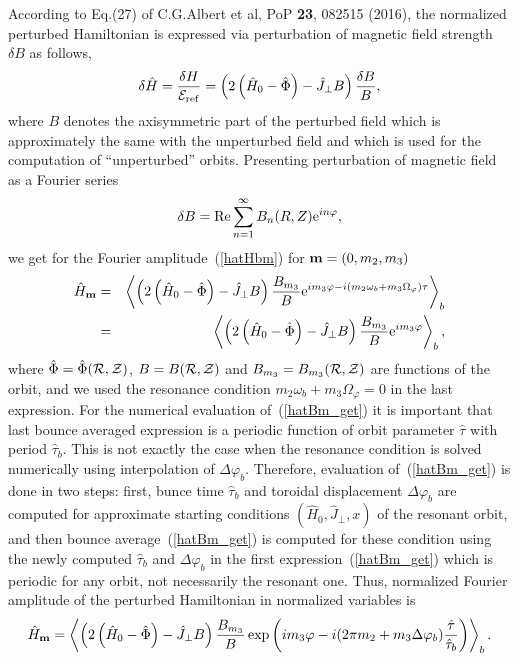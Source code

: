 \documentclass[preprint,prb,aps]{revtex4-1}
\newcommand{\be}[1]{\begin{equation} \label{#1}}
\newcommand{\ee}{\end{equation}}
\newcommand{\bea}[1]{\begin{eqnarray} \label{#1}}
\newcommand{\eea}{\end{eqnarray}}
\newcommand{\eq}[1]{(\ref{#1})}
\renewcommand{\bm}{{\bf m}}
\newcommand{\cR}{{\cal R}}
\newcommand{\cZ}{{\cal Z}}
\newcommand{\cE}{{\cal E}}
\begin{document}
According to Eq.(27) of C.G.Albert et al, PoP {\bf 23}, 082515 (2016),
the normalized perturbed Hamiltonian is expressed via perturbation
of magnetic field strength $\delta B$ as follows,
\be{normperham}
\delta\hat H = \frac{\delta H}{\cE_{\rm ref}}
=\left(2\left(\hat H_0-\hat\Phi\right)-\hat J_\perp B
\right)\frac{\delta B}{B},
\ee
where $B$ denotes the axisymmetric part of the perturbed field which is
approximately the same with the unperturbed field and which is used for the
computation of ``unperturbed'' orbits.
Presenting perturbation of magnetic field as a Fourier series
\be{bmodfour}
\delta B = {\rm Re}\sum\limits_{n=1}^\infty B_n(R,Z){\rm e}^{in\varphi},
\ee
we get for the Fourier amplitude~\eq{hatHbm} for $\bm=(0,m_2,m_3)$
\bea{hatBm_get}
\hat H_\bm 
&=& \left\langle 
\left(2\left(\hat H_0-\hat\Phi\right)-\hat J_\perp B
\right)\frac{B_{m_3}}{B}{\rm e}^{im_3\varphi-i(m_2\omega_b+m_3\Omega_\varphi)\tau}
\right\rangle_b
\nonumber \\
&=& \left\langle 
\left(2\left(\hat H_0-\hat\Phi\right)-\hat J_\perp B
\right)\frac{B_{m_3}}{B}{\rm e}^{im_3\varphi}
\right\rangle_b,
\eea
where $\hat\Phi=\hat\Phi(\cR,\cZ)$, $B=B(\cR,\cZ)$ and $B_{m_3}=B_{m_3}(\cR,\cZ)$
are functions of the orbit,
and we used the resonance condition $m_2\omega_b+m_3\Omega_\varphi=0$ in the
last expression. For the numerical evaluation of~\eq{hatBm_get} it is important
that last bounce averaged expression is a periodic function of orbit parameter 
$\hat\tau$ with period $\hat\tau_b$. This is not exactly the case when the resonance
condition is solved numerically using interpolation of $\Delta\varphi_b$. Therefore,
evaluation of~\eq{hatBm_get} is done in two steps: first, bunce time $\hat\tau_b$
and toroidal displacement $\Delta\varphi_b$ are computed for approximate starting
conditions $(\hat H_0,\hat J_\perp, x)$ of the resonant orbit, and then bounce 
average~\eq{hatBm_get} is computed for these condition using the newly computed
$\hat\tau_b$ and $\Delta\varphi_b$ in the first expression~\eq{hatBm_get} 
which is periodic for any orbit, not necessarily the resonant one. 
Thus, normalized Fourier amplitude of the perturbed Hamiltonian in normalized 
variables is
\be{hatBm_norm}
\hat H_\bm
= \left\langle
\left(2\left(\hat H_0-\hat\Phi\right)-\hat J_\perp B
\right)\frac{B_{m_3}}{B}
\exp\left
(im_3\varphi-i(2\pi m_2+m_3\Delta\varphi_b)\frac{\hat\tau}{\hat\tau_b}
\right)
\right\rangle_b.
\ee
\end{document}
